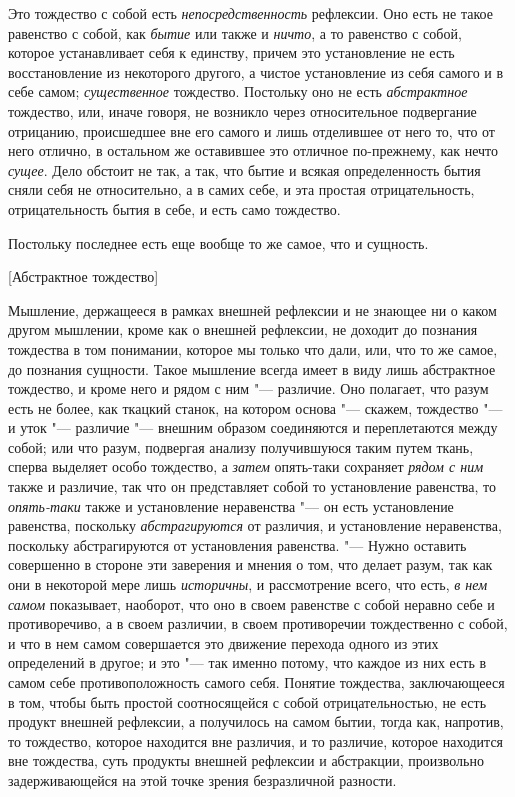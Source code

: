 Это тождество с собой есть {\em непосредственность}
рефлексии. Оно есть не такое равенство с собой, как
{\em бытие} или также и
{\em ничто}, а то равенство с собой, которое
устанавливает себя к единству, причем это установление не есть
восстановление из некоторого другого, а чистое установление из себя самого
и в себе самом; {\em существенное} тождество. Постольку
оно не есть {\em абстрактное} тождество, или, иначе
говоря, не возникло через относительное подвергание отрицанию, происшедшее
вне его самого и лишь отделившее от него то, что от него отлично, в
остальном же оставившее это отличное по-прежнему, как нечто
{\em сущее}. Дело обстоит не так, а так, что бытие и
всякая определенность бытия сняли себя не относительно, а в самих себе, и
эта простая отрицательность, отрицательность бытия в себе, и есть само
тождество.

Постольку последнее есть еще вообще то же самое, что и сущность.

%
  {[Абстрактное тождество]}

Мышление, держащееся в рамках внешней рефлексии и не знающее ни о каком
другом мышлении, кроме как о внешней рефлексии, не доходит до познания
тождества в том понимании, которое мы только что дали, или, что то же
самое, до познания сущности. Такое мышление всегда имеет в виду лишь
абстрактное тождество, и кроме него и рядом с ним "--- различие. Оно полагает,
что разум есть не более, как ткацкий станок, на котором основа "--- скажем,
тождество "--- и уток "--- различие "--- внешним образом соединяются и переплетаются
между собой; или что разум, подвергая анализу получившуюся таким путем
ткань, сперва выделяет особо тождество, а {\em затем}
опять-таки сохраняет {\em рядом с ним} также и
различие, так что он представляет собой то установление равенства, то
{\em опять-таки} также и установление неравенства "--- он
есть установление равенства, поскольку
{\em абстрагируются} от различия, и установление
неравенства, поскольку абстрагируются от установления равенства. "--- Нужно
оставить совершенно в стороне эти заверения и мнения о том, что делает
разум, так как они в некоторой мере лишь
{\em историчны}, и рассмотрение всего, что есть,
{\em в нем самом} показывает, наоборот, что оно в своем
равенстве с собой неравно себе и противоречиво, а в своем различии, в своем
противоречии тождественно с собой, и что в нем самом совершается это
движение перехода одного из этих определений в другое; и это "--- так именно
потому, что каждое из них есть в самом себе противоположность самого себя.
Понятие тождества, заключающееся в том, чтобы быть простой соотносящейся с
собой отрицательностью, не есть продукт внешней рефлексии, а получилось на
самом бытии, тогда как, напротив, то тождество, которое находится вне
различия, и то различие, которое находится вне тождества, суть продукты
внешней рефлексии и абстракции, произвольно задерживающейся на этой точке
зрения безразличной разности.

